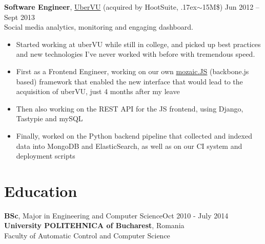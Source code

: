 \documentclass[line, margin]{resume}
\newcommand{\bettertilde}{\raise.17ex\hbox{$\scriptstyle\mathtt{\sim}$}}
\begin{document}
\begin{resume}
\textbf{Software Engineer}, \href{http://ubervu.com}{UberVU} (acquired by HootSuite, \bettertilde15M\$) \hfill Jun 2012 -- Sept 2013\\
Social media analytics, monitoring and engaging dashboard.
\begin{itemize} \itemsep -2pt  %
	\item Started working at uberVU while still in college, and picked up best practices and new technologies I've never worked with before with tremendous speed.
	\item First as a Frontend Engineer, working on our own \href{https://github.com/uberVU/mozaic/}{mozaic.JS} (backbone.js based) framework that enabled the new interface that would lead to the acquisition of uberVU, just 4 months after my leave
    \item Then also working on the REST API for the JS frontend, using Django, Tastypie and mySQL
    \item Finally, worked on the Python backend pipeline that collected and indexed data into MongoDB and ElasticSearch, as well as on our CI system and deployment scripts
\end{itemize}



    \section{Education}


    \textbf{BSc}, Major in Engineering and Computer Science\hfill Oct 2010 - July 2014\\
    \textbf{University POLITEHNICA of Bucharest}, Romania\\
    Faculty of Automatic Control and Computer Science

\end{resume}
\end{document}
